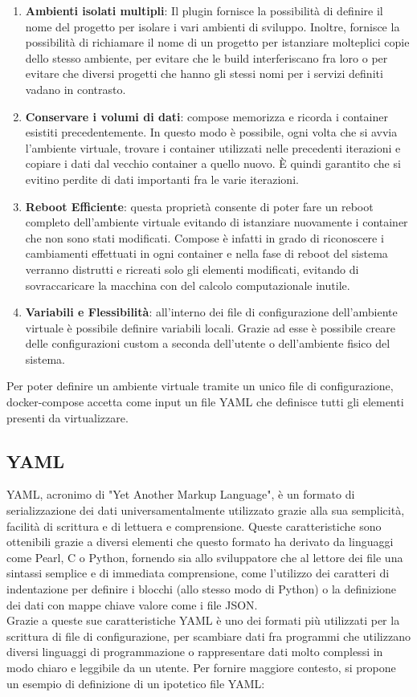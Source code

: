 \begin{enumerate}
    \item \textbf{Ambienti isolati multipli}: Il plugin fornisce la possibilità di definire il nome del progetto per isolare i vari ambienti di sviluppo. Inoltre, fornisce la possibilità di richiamare il nome di un progetto per istanziare molteplici copie dello stesso ambiente, per evitare che le build interferiscano fra loro o 
        per evitare che diversi progetti che hanno gli stessi nomi per i servizi definiti vadano in contrasto.
    \item \textbf{Conservare i volumi di dati}: compose memorizza e ricorda i container esistiti precedentemente. In questo modo è possibile, ogni volta che si avvia l'ambiente virtuale, trovare i container utilizzati nelle precedenti iterazioni e copiare i dati dal vecchio container a quello nuovo. 
        È quindi garantito che si evitino perdite di dati importanti fra le varie iterazioni. 
    \item \textbf{Reboot Efficiente}: questa proprietà consente di poter fare un reboot completo dell'ambiente virtuale evitando di istanziare nuovamente i container che non sono stati modificati. Compose è infatti in grado di riconoscere i cambiamenti effettuati in ogni container e nella fase di reboot del sistema verranno distrutti e ricreati
        solo gli elementi modificati, evitando di sovraccaricare la macchina con del calcolo computazionale inutile.
    \item \textbf{Variabili e Flessibilità}: all'interno dei file di configurazione dell'ambiente virtuale è possibile definire variabili locali. Grazie ad esse è possibile creare delle configurazioni custom a seconda dell'utente o dell'ambiente fisico del sistema.
\end{enumerate}

Per poter definire un ambiente virtuale tramite un unico file di configurazione, docker-compose accetta come input un file YAML che definisce tutti gli elementi presenti da virtualizzare. 

\subsection{YAML}
YAML\cite{yaml}, acronimo di "Yet Another Markup Language", è un formato di serializzazione dei dati universamentalmente utilizzato grazie alla sua semplicità, facilità di scrittura e di lettuera e comprensione.
Queste caratteristiche sono ottenibili grazie a diversi elementi che questo formato ha derivato da linguaggi come Pearl, C o Python, fornendo sia allo sviluppatore che al lettore dei file una sintassi semplice e di immediata comprensione, come l'utilizzo dei caratteri di indentazione per definire i blocchi (allo stesso modo di Python) o la definizione
dei dati con mappe chiave valore come i file JSON.\\
Grazie a queste sue caratteristiche YAML è uno dei formati più utilizzati per la scrittura di file di configurazione, per scambiare dati fra programmi che utilizzano diversi linguaggi di programmazione o rappresentare dati molto complessi in modo chiaro e leggibile da un utente.
Per fornire maggiore contesto, si propone un esempio di definizione di un ipotetico file YAML:

